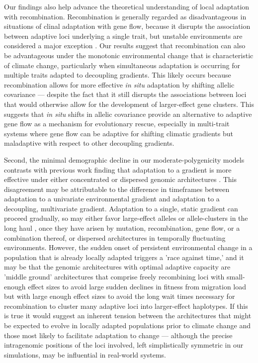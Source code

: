 \documentclass[9pt,twocolumn,twoside,lineno]{pnas-new}
\begin{document}
Our findings also help advance the theoretical understanding
of local adaptation with recombination.
Recombination is generally regarded as disadvantageous
in situations of clinal adaptation
with gene flow, because it disrupts the
association between adaptive loci 
underlying a single trait,
but unstable environments are considered a major exception \cite{tigano}.
Our results suggest that recombination can also
be advantageous under the monotonic environmental
change that is characteristic of climate change,
particularly when simultaneous adaptation is occurring
for multiple traits adapted to decoupling gradients.
This likely occurs because recombination
allows for more effective \textit{in situ} adaptation
by shifting allelic covariance --- despite the fact that
it still disrupts the associations between loci
that would otherwise allow for the development of
larger-effect gene clusters.
This suggests that \textit{in situ} shifts in allelic covariance
provide an alternative to adaptive gene flow as a mechanism for evolutionary rescue,
especially in multi-trait systems where gene flow can be adaptive
for shifting climatic gradients but maladaptive with
respect to other decoupling gradients.
 
Second, the minimal demographic decline
in our moderate-polygenicity models
contrasts with previous work finding that adaptation
to a gradient is more effective under either
concentrated or dispersed genomic architectures \cite{yeaman_whitlock}.
This disagreement may be attributable to the
difference in timeframes between adaptation to a univariate environmental gradient
and adaptation to a decoupling, multivariate gradient.
Adaptation to a single, static gradient can proceed gradually,
so may either favor large-effect alleles or allele-clusters in the long haul
\cite{yeaman_amnat,yeaman_review},
once they have arisen by mutation, recombination, gene flow, or a combination thereof,
or dispersed architectures 
\cite{burger,kondrashov,yeaman_review,yeaman_whitlock}
in temporally fluctuating environments.
However, the sudden onset of persistent environmental change 
in a population that is already locally adapted triggers a 'race against time,' 
and it may be that the genomic architectures with
optimal adaptive capacity are 'middle ground' architectures that comprise
freely recombining loci with small-enough effect sizes to avoid large
sudden declines in fitness from migration load
but with large enough effect sizes to avoid the long wait times necessary
for recombination to cluster many adaptive loci into larger-effect haplotypes.
If this is true it would suggest an inherent tension between the architectures that
might be expected to evolve in locally adapted populations prior to climate change
and those most likely to facilitate adaptation to change --- although
the precise intragenomic positions of the loci involved,
left simplistically symmetric in our simulations, may be influential in real-world systems.
 
\end{document}
